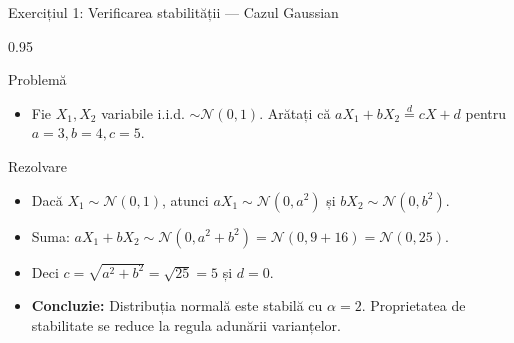 \documentclass[9pt, aspectratio=169, t]{beamer}
\begin{document}
\begin{frame}{Exercițiul 1: Verificarea stabilității --- Cazul Gaussian}
    \begin{cminipage}{0.95\textwidth}
\begin{block}{Problemă}
\begin{itemize}\setlength{\itemsep}{0pt}
    \item Fie $X_1, X_2$ variabile i.i.d. $\sim \mathcal{N}(0, 1)$. Arătați că
$a X_1 + b X_2 \stackrel{d}{=} c X + d$ pentru $a=3, b=4, c=5$.
\end{itemize}
\end{block}

\begin{exampleblock}{Rezolvare}
\begin{itemize}\setlength{\itemsep}{0pt}
    \item Dacă $X_1 \sim \mathcal{N}(0, 1)$, atunci $aX_1 \sim \mathcal{N}(0, a^2)$ și $bX_2 \sim \mathcal{N}(0, b^2)$.
    \item Suma: $aX_1 + bX_2 \sim \mathcal{N}(0, a^2 + b^2) = \mathcal{N}(0, 9 + 16) = \mathcal{N}(0, 25)$.
    \item Deci $c = \sqrt{a^2 + b^2} = \sqrt{25} = 5$ și $d = 0$.
    \item \textbf{Concluzie:} Distribuția normală este stabilă cu $\alpha = 2$. Proprietatea de stabilitate se reduce la regula adunării varianțelor.
\end{itemize}
\end{exampleblock}
    \end{cminipage}
\end{frame}
\end{document}
